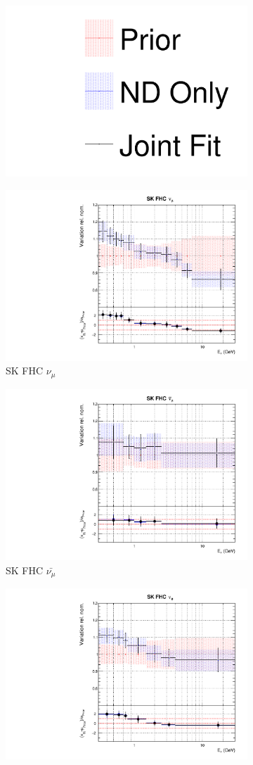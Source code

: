 \begin{figure}
\centering
\begin{subfigure}{0.8\textwidth}
  \centering
  \includegraphics[width=0.24\linewidth]{figs/joint_leg}
\end{subfigure}
\begin{subfigure}{0.45\textwidth}
  \centering
  \includegraphics[width=0.75\linewidth]{figs/jointflux8}
  \caption{SK FHC $\nu_{\mu}$}
\end{subfigure}
\begin{subfigure}{0.45\textwidth}
  \centering
  \includegraphics[width=0.75\linewidth]{figs/jointflux9}
  \caption{SK FHC $\bar{\nu_{\mu}}$}
\end{subfigure}
\begin{subfigure}{0.45\textwidth}
  \centering
  \includegraphics[width=0.75\linewidth]{figs/jointflux10}

\end{subfigure}
\end{figure}
